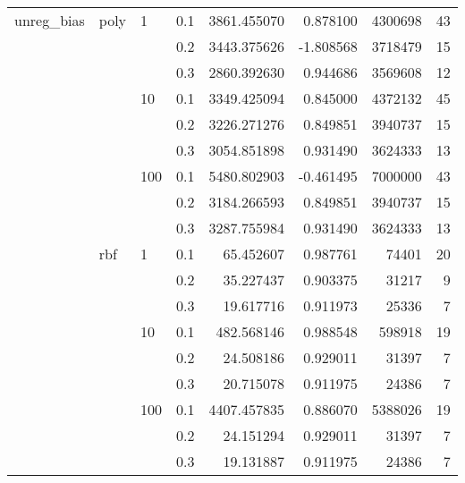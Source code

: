 \begin{table}[H]
\begin{tabular}{llllrrrr}
unreg\_bias & poly & 1   & 0.1 &  3861.455070 &  0.878100 &  4300698 &    43 \\
           &     &     & 0.2 &  3443.375626 & -1.808568 &  3718479 &    15 \\
           &     &     & 0.3 &  2860.392630 &  0.944686 &  3569608 &    12 \\
           &     & 10  & 0.1 &  3349.425094 &  0.845000 &  4372132 &    45 \\
           &     &     & 0.2 &  3226.271276 &  0.849851 &  3940737 &    15 \\
           &     &     & 0.3 &  3054.851898 &  0.931490 &  3624333 &    13 \\
           &     & 100 & 0.1 &  5480.802903 & -0.461495 &  7000000 &    43 \\
           &     &     & 0.2 &  3184.266593 &  0.849851 &  3940737 &    15 \\
           &     &     & 0.3 &  3287.755984 &  0.931490 &  3624333 &    13 \\
           & rbf & 1   & 0.1 &    65.452607 &  0.987761 &    74401 &    20 \\
           &     &     & 0.2 &    35.227437 &  0.903375 &    31217 &     9 \\
           &     &     & 0.3 &    19.617716 &  0.911973 &    25336 &     7 \\
           &     & 10  & 0.1 &   482.568146 &  0.988548 &   598918 &    19 \\
           &     &     & 0.2 &    24.508186 &  0.929011 &    31397 &     7 \\
           &     &     & 0.3 &    20.715078 &  0.911975 &    24386 &     7 \\
           &     & 100 & 0.1 &  4407.457835 &  0.886070 &  5388026 &    19 \\
           &     &     & 0.2 &    24.151294 &  0.929011 &    31397 &     7 \\
           &     &     & 0.3 &    19.131887 &  0.911975 &    24386 &     7 \\
\bottomrule
\end{tabular}
\end{table}
